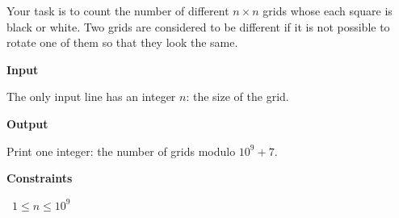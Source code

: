 Your task is to count the number of different $n \times n$ grids whose each square is black or white.
Two grids are considered to be different if it is not possible to rotate one of them so that they look the same.

\vspace{0.3cm}\noindent\textbf{Input}

The only input line has an integer $n$: the size of the grid.

\vspace{0.3cm}\noindent\textbf{Output}

Print one integer: the number of grids modulo $10^9+7$.

\vspace{0.3cm}\noindent\textbf{Constraints}

\textbullet\ $1 \le n \le 10^9$